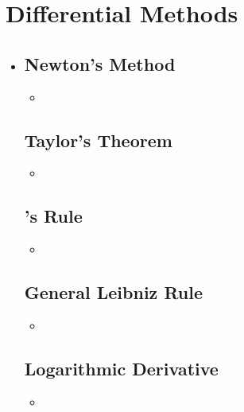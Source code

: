 \section{Differential Methods}
\begin{itemize}
  \item []
  
  \subsection{Newton's Method}
  \begin{itemize}
    \item 
  \end{itemize}

  \subsection{Taylor's Theorem}
  \begin{itemize}
    \item 
  \end{itemize}

  \subsection{\hopital's Rule}
  \begin{itemize}
    \item 
  \end{itemize}
  
  \subsection{General Leibniz Rule}
  \begin{itemize}
    \item 
  \end{itemize}
  
  \subsection{Logarithmic Derivative}
  \begin{itemize}
    \item 
  \end{itemize}
  
  
\end{itemize}





